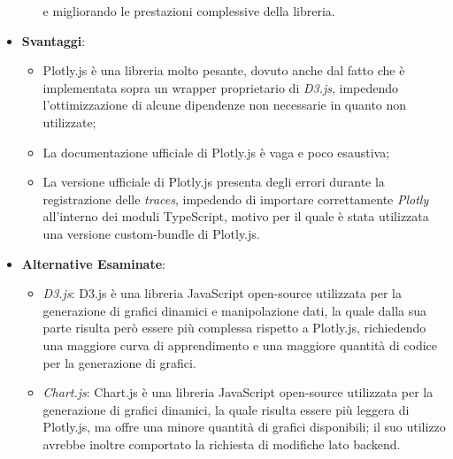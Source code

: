 \begin{itemize}
\begin{itemize}
                        e migliorando le prestazioni complessive della libreria.
            \end{itemize}
      \item \textbf{Svantaggi}:
            \begin{itemize}
                  \item Plotly.js è una libreria molto pesante, dovuto anche dal fatto che è implementata sopra un wrapper proprietario di \textit{D3.js},
                        impedendo l'ottimizzazione di alcune dipendenze non necessarie in quanto non utilizzate;
                  \item La documentazione ufficiale di Plotly.js è vaga e poco esaustiva;
                  \item La versione ufficiale di Plotly.js presenta degli errori durante la registrazione delle \textit{traces}, impedendo di importare correttamente
                        \textit{Plotly} all'interno dei moduli TypeScript, motivo per il quale è stata utilizzata una versione custom-bundle di Plotly.js.
            \end{itemize}
      \item \textbf{Alternative Esaminate}:
            \begin{itemize}
                  \item \textit{D3.js}: D3.js è una libreria JavaScript open-source utilizzata per la generazione di grafici dinamici e manipolazione dati, la quale dalla sua parte risulta però
                        essere più complessa rispetto a Plotly.js, richiedendo una maggiore curva di apprendimento e una maggiore quantità di codice per la generazione di grafici.
                  \item \textit{Chart.js}: Chart.js è una libreria JavaScript open-source utilizzata per la generazione di grafici dinamici, la quale risulta essere più leggera di Plotly.js,
                        ma offre una minore quantità di grafici disponibili; il suo utilizzo avrebbe inoltre comportato la richiesta di modifiche lato backend.
            \end{itemize}
\end{itemize}

